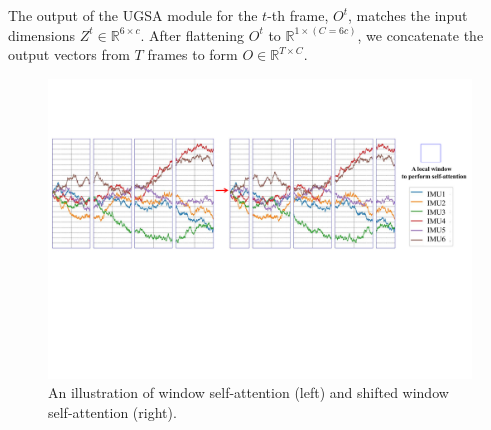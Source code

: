\documentclass[letterpaper]{article} %
\begin{document}
The output of the UGSA module for the \(t\)-th frame, \({O}^{t}\), matches the input dimensions \({Z}^{t} \in \mathbb{R}^{6\times c}\). After flattening \({O}^{t}\) to \(\mathbb{R}^{1\times (C=6c)}\), we concatenate the output vectors from \(T\) frames to form \({O} \in \mathbb{R}^{T\times C}\).
\begin{figure}[t]
\centering
\includegraphics[width=\columnwidth]{window_partition.pdf} 
\caption{An illustration of window self-attention (left) and shifted window self-attention (right).}
\label{fig3}
\end{figure}
\end{document}
